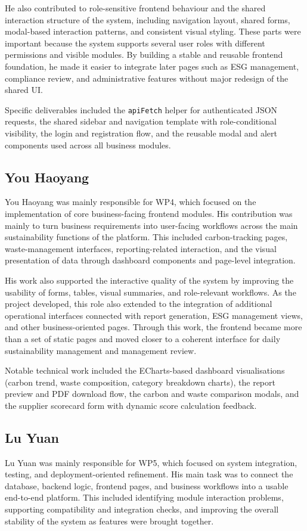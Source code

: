 \documentclass[11pt,a4paper]{article}
\begin{document}
He also contributed to role-sensitive frontend behaviour and the shared interaction structure of the system, including navigation layout, shared forms, modal-based interaction patterns, and consistent visual styling. These parts were important because the system supports several user roles with different permissions and visible modules. By building a stable and reusable frontend foundation, he made it easier to integrate later pages such as ESG management, compliance review, and administrative features without major redesign of the shared UI.

Specific deliverables included the \texttt{apiFetch} helper for authenticated JSON requests, the shared sidebar and navigation template with role-conditional visibility, the login and registration flow, and the reusable modal and alert components used across all business modules.

\subsection{You Haoyang}
You Haoyang was mainly responsible for WP4, which focused on the implementation of core business-facing frontend modules. His contribution was mainly to turn business requirements into user-facing workflows across the main sustainability functions of the platform. This included carbon-tracking pages, waste-management interfaces, reporting-related interaction, and the visual presentation of data through dashboard components and page-level integration.

His work also supported the interactive quality of the system by improving the usability of forms, tables, visual summaries, and role-relevant workflows. As the project developed, this role also extended to the integration of additional operational interfaces connected with report generation, ESG management views, and other business-oriented pages. Through this work, the frontend became more than a set of static pages and moved closer to a coherent interface for daily sustainability management and management review.

Notable technical work included the ECharts-based dashboard visualisations (carbon trend, waste composition, category breakdown charts), the report preview and PDF download flow, the carbon and waste comparison modals, and the supplier scorecard form with dynamic score calculation feedback.

\subsection{Lu Yuan}
Lu Yuan was mainly responsible for WP5, which focused on system integration, testing, and deployment-oriented refinement. His main task was to connect the database, backend logic, frontend pages, and business workflows into a usable end-to-end platform. This included identifying module interaction problems, supporting compatibility and integration checks, and improving the overall stability of the system as features were brought together.
\end{document}
